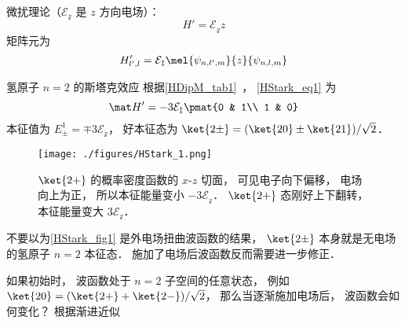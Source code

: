 
\begin{issues}
\issueDraft
\end{issues}


微扰理论（$\mathcal{E_z}$ 是 $z$ 方向电场）：
\begin{equation}
H' = \mathcal{E_z} z
\end{equation}
矩阵元为
\begin{equation}\label{HStark_eq1}
H'_{l',l} = \mathcal{E_z}\mel{\psi_{n,l',m}}{z}{\psi_{n,l,m}}
\end{equation}


\begin{example}{氢原子 $n=2$ 的斯塔克效应}
根据\autoref{HDipM_tab1}~， \autoref{HStark_eq1} 为
\begin{equation}
\mat H' = -3\mathcal{E_z}\pmat{0 & 1\\ 1 & 0}
\end{equation}
本征值为 $E_{\pm}^1 = \mp 3\mathcal{E_z}$， 好本征态为 $\ket{2\pm} = (\ket{20} \pm \ket{21})/{\sqrt 2}$．

\begin{figure}[ht]
\centering
\texttt{[image: ./figures/HStark\_1.png]}
\caption{$\ket{2+}$ 的概率密度函数的 $x$-$z$ 切面， 可见电子向下偏移， 电场向上为正， 所以本征能量变小 $-3\mathcal{E_z}$． $\ket{2+}$ 态刚好上下翻转， 本征能量变大 $3\mathcal{E_z}$．} \label{HStark_fig1}
\end{figure}

不要以为\autoref{HStark_fig1} 是外电场扭曲波函数的结果， $\ket{2\pm}$ 本身就是无电场的氢原子 $n=2$ 本征态． 施加了电场后波函数反而需要进一步修正．

如果初始时， 波函数处于 $n=2$ 子空间的任意状态， 例如 $\ket{20} = (\ket{2+} + \ket{2-})/\sqrt 2$， 那么当逐渐施加电场后， 波函数会如何变化？ 根据渐进近似
\end{example}
